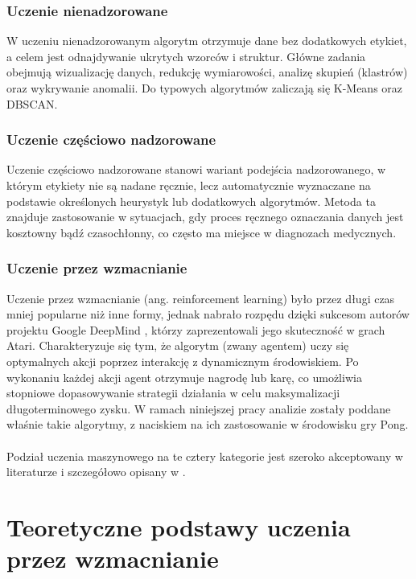 \documentclass[a4paper, 12pt]{article}
\begin{document}
    \subsubsection{Uczenie nienadzorowane}
    W uczeniu nienadzorowanym algorytm otrzymuje dane bez dodatkowych etykiet, a celem jest odnajdywanie ukrytych wzorców i struktur. Główne zadania obejmują wizualizację danych, redukcję wymiarowości, analizę skupień (klastrów) oraz wykrywanie anomalii. Do typowych algorytmów zaliczają się K-Means oraz DBSCAN.

    \subsubsection{Uczenie częściowo nadzorowane}
    Uczenie częściowo nadzorowane stanowi wariant podejścia nadzorowanego, w którym etykiety nie są nadane ręcznie, lecz automatycznie wyznaczane na podstawie określonych heurystyk lub dodatkowych algorytmów. Metoda ta znajduje zastosowanie w sytuacjach, gdy proces ręcznego oznaczania danych jest kosztowny bądź czasochłonny, co często ma miejsce w diagnozach medycznych.

    \subsubsection{Uczenie przez wzmacnianie}
    Uczenie przez wzmacnianie (ang. reinforcement learning) było przez długi czas mniej popularne niż inne formy, jednak nabrało rozpędu dzięki sukcesom autorów projektu Google DeepMind \cite{mnih2015nature}, którzy zaprezentowali jego skuteczność w grach Atari. Charakteryzuje się tym, że algorytm (zwany agentem) uczy się optymalnych akcji poprzez interakcję z dynamicznym środowiskiem. Po wykonaniu każdej akcji agent otrzymuje nagrodę lub karę, co umożliwia stopniowe dopasowywanie strategii działania w celu maksymalizacji długoterminowego zysku. W ramach niniejszej pracy analizie zostały poddane właśnie takie algorytmy, z naciskiem na ich zastosowanie w środowisku gry Pong.
    \\ \\ 
    Podział uczenia maszynowego na te cztery kategorie jest szeroko akceptowany w literaturze i szczegółowo opisany w \cite{sutton2018rl}.

    
    \section{Teoretyczne podstawy uczenia przez wzmacnianie}
\end{document}
